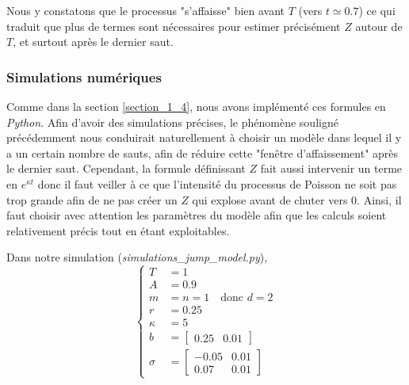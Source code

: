 \documentclass[../finalreport.tex]{subfiles}
\begin{document}
\par Nous y constatons que le processus "s'affaisse" bien avant $T$ (vers $t \simeq 0.7$) ce qui traduit que plus de termes sont nécessaires pour estimer précisément $Z$ autour de $T$, et surtout après le dernier saut.

\subsubsection{Simulations numériques}

\par Comme dans la section \ref{section_1_4}, nous avons implémenté ces formules en \emph{Python}. Afin d'avoir des simulations précises, le phénomène souligné précédemment nous conduirait naturellement à choisir un modèle dans lequel il y a un certain nombre de sauts, afin de réduire cette "fenêtre d'affaissement" après le dernier saut. Cependant, la formule définissant $Z$ fait aussi intervenir un terme en $e^{\kappa t}$ donc il faut veiller à ce que l'intensité du processus de Poisson ne soit pas trop grande afin de ne pas créer un $Z$ qui explose avant de chuter vers $0$. Ainsi, il faut choisir avec attention les paramètres du modèle afin que les calculs soient relativement précis tout en étant exploitables.

\par Dans notre simulation (\emph{simulations\_jump\_model.py}), 
\begin{displaymath}
\begin{cases}
T &= 1 \\
A &= 0.9 \\
m &= n = 1 \quad \text{donc } d = 2 \\
r &= 0.25 \\
\kappa &= 5 \\
b &= \begin{bmatrix}
		0.25 & 0.01
	\end{bmatrix} \\
\sigma &= \begin{bmatrix}
			-0.05 & 0.01 \\
			0.07 & 0.01
		  \end{bmatrix}
\end{cases}
\end{displaymath}
\end{document}
